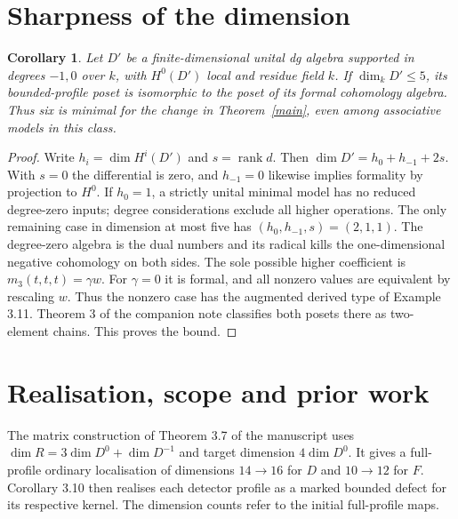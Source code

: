 \documentclass[11pt]{article}
\newtheorem{cor}[thm]{Corollary}
\begin{document}
\section{Sharpness of the dimension}
\begin{cor}
Let $D'$ be a finite-dimensional unital dg algebra supported in degrees
$-1,0$ over $k$, with $H^0(D')$ local and residue field $k$. If
$\dim_k D'\le5$, its bounded-profile poset is isomorphic to the poset
of its formal cohomology algebra. Thus six is minimal for the change in
Theorem~\ref{main}, even among associative models in this class.
\end{cor}
\begin{proof}
Write $h_i=\dim H^i(D')$ and $s=\operatorname{rank}d$. Then
$\dim D'=h_0+h_{-1}+2s$. With $s=0$ the differential is zero, and
$h_{-1}=0$ likewise implies formality by projection to $H^0$. If $h_0=1$,
a strictly unital minimal model has no reduced degree-zero inputs; degree
considerations exclude all higher operations. The only remaining case in
dimension at most five has $(h_0,h_{-1},s)=(2,1,1)$. The degree-zero
algebra is the dual numbers and its radical kills the one-dimensional
negative cohomology on both sides. The sole possible higher coefficient
is $m_3(t,t,t)=\gamma w$. For $\gamma=0$ it is formal, and all nonzero
values are equivalent by rescaling $w$. Thus the nonzero case has the
augmented derived type of Example 3.11. Theorem 3 of the companion note
classifies both posets there as two-element chains. This proves the bound.
\end{proof}

\section{Realisation, scope and prior work}
The matrix construction of Theorem 3.7 of the manuscript uses $\dim
R=3\dim D^0+\dim D^{-1}$ and target dimension $4\dim D^0$. It gives
a full-profile ordinary localisation of dimensions $14\to16$ for $D$
and $10\to12$ for $F$. Corollary 3.10 then realises each detector
profile as a marked bounded defect for its respective kernel. The
dimension counts refer to the initial full-profile maps.
\end{document}
